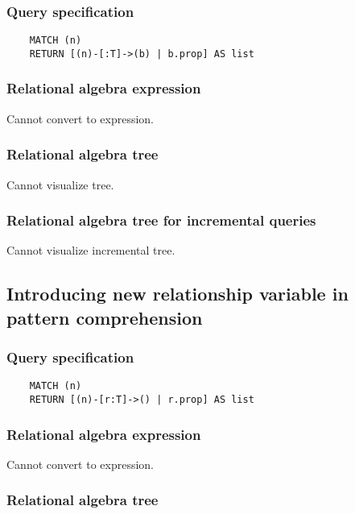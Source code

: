 	\subsubsection*{Query specification}

	\begin{lstlisting}
	MATCH (n)
	RETURN [(n)-[:T]->(b) | b.prop] AS list
	\end{lstlisting}


	\subsubsection*{Relational algebra expression}

	Cannot convert to expression.

	\subsubsection*{Relational algebra tree}

	Cannot visualize tree.

	\subsubsection*{Relational algebra tree for incremental queries}

	Cannot visualize incremental tree.
	\subsection{Introducing new relationship variable in pattern comprehension}

	\subsubsection*{Query specification}

	\begin{lstlisting}
	MATCH (n)
	RETURN [(n)-[r:T]->() | r.prop] AS list
	\end{lstlisting}


	\subsubsection*{Relational algebra expression}

	Cannot convert to expression.

	\subsubsection*{Relational algebra tree}

